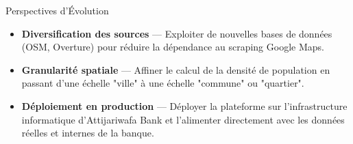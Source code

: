 \documentclass[aspectratio=169, 9pt]{beamer}
\begin{document}
\begin{frame}{Perspectives d'Évolution}
  \vspace{0.4cm}
  
  \begin{itemize}
    \vspace{0.2cm}
    \item {\color{AccentOrange}\faDatabase} \textbf{Diversification des sources} --- Exploiter de nouvelles bases de données (OSM, Overture) pour réduire la dépendance au scraping Google Maps.
    
    \vspace{0.4cm}
    \item {\color{AccentBlue}\faMap} \textbf{Granularité spatiale} --- Affiner le calcul de la densité de population en passant d'une échelle "ville" à une échelle "commune" ou "quartier".
    
    \vspace{0.4cm}
    \item {\color{AccentGreen}\faServer} \textbf{Déploiement en production} --- Déployer la plateforme sur l'infrastructure informatique d'Attijariwafa Bank et l'alimenter directement avec les données réelles et internes de la banque.
  \end{itemize}

\end{frame}

\begin{frame}[plain]
\end{frame}
\end{document}
